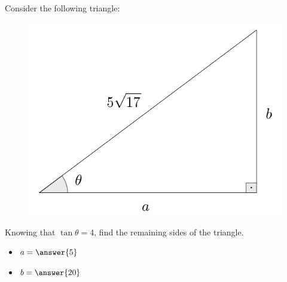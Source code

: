 \documentclass{ximera}
\author{Ivo Terek}
\begin{document}
\begin{exercise}

  
  Consider the following triangle:

  \begin{figure}[h]
    \centering
    \includegraphics[scale=.3]{RTT4-fig.png}
  \end{figure}
  
  Knowing that $\tan\theta = 4$, find the remaining sides of the triangle.

  \begin{itemize}
  \item $a = \answer{5}$ 
  \item $b = \answer{20}$
  \end{itemize}

\end{exercise}
\end{document}
